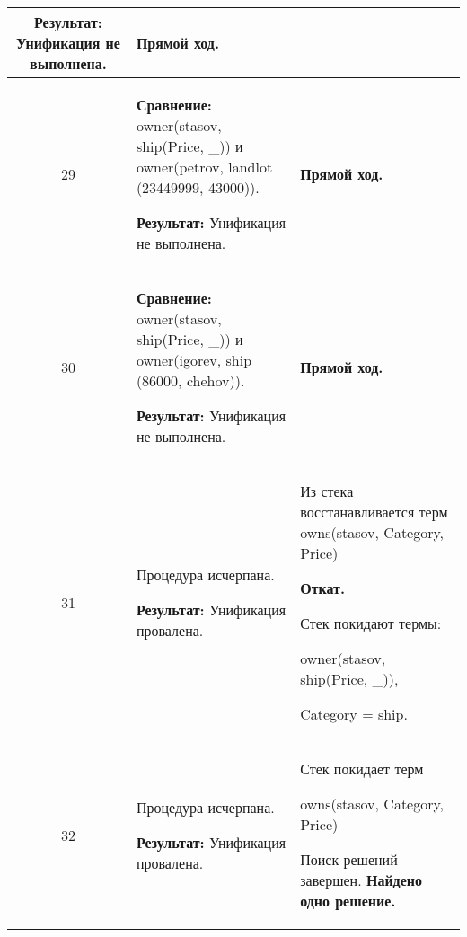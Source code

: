 \begin{longtable}{|c|p{}|p{}|}
  \textbf{Результат:}\newline
  Унификация не выполнена.
                       &
  \textbf{Прямой ход.}
                       \\ \hline

29
                       &
\textbf{Сравнение:}\newline
  owner(stasov, ship(Price, \_))
  \newline{}и\newline
  owner(petrov, landlot (23449999, 43000)).
  \newline

  \textbf{Результат:}\newline
  Унификация не выполнена.
                       &
  \textbf{Прямой ход.}
                       \\ \hline

30
                       &
\textbf{Сравнение:}\newline
  owner(stasov, ship(Price, \_))
  \newline{}и\newline
  owner(igorev, ship    (86000,    chehov)).
  \newline

  \textbf{Результат:}\newline
  Унификация не выполнена.
                       &
  \textbf{Прямой ход.}
                       \\ \hline

31
                       &
  Процедура исчерпана.

  \textbf{Результат:}\newline
  Унификация провалена.
                       &
  Из стека восстанавливается терм
  owns(stasov, Category, Price)

  \newline

  \textbf{Откат.}
  \newline

  Стек покидают термы:

    owner(stasov, ship(Price, \_)),

    Category = ship.
                       \\ \hline

32
                       &
  Процедура исчерпана.

  \textbf{Результат:}\newline
  Унификация провалена.
                       &
  Стек покидает терм

  owns(stasov, Category, Price)
  \newline

  Поиск решений завершен. \textbf{Найдено одно решение.}
                       \\ \hline
\end{longtable}
\normalsize

